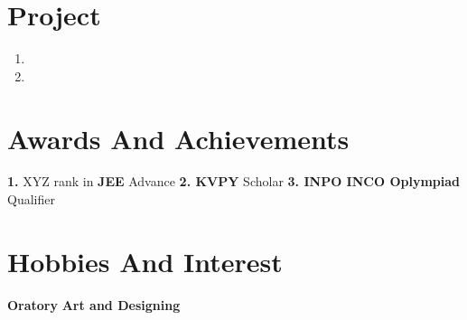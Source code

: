 \documentclass{article}
\begin{document}
\section*{Project}
\begin{enumerate}
    \item \lipsum[10]
     \item \lipsum[10]
\end{enumerate}

\section*{Awards And Achievements}
\textbf{1.}  XYZ rank in \textbf{JEE} Advance\newline
\textbf{2. KVPY} Scholar\newline
\textbf{3. INPO INCO Oplympiad } Qualifier

\section*{Hobbies And Interest}
\textbf{Oratory}\newline
\textbf{Art and Designing}
\end{document}
